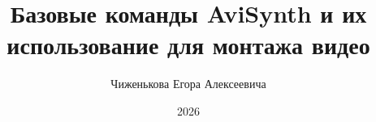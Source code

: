 \documentclass[otchet]{SCWorks}
\begin{document}
\title{Базовые команды AviSynth и их использование для монтажа видео}
\author{Чиженькова Егора Алексеевича}
\date{2026}

\maketitle

\tableofcontents

\intro





\conclusion





\appendix
\end{document}
